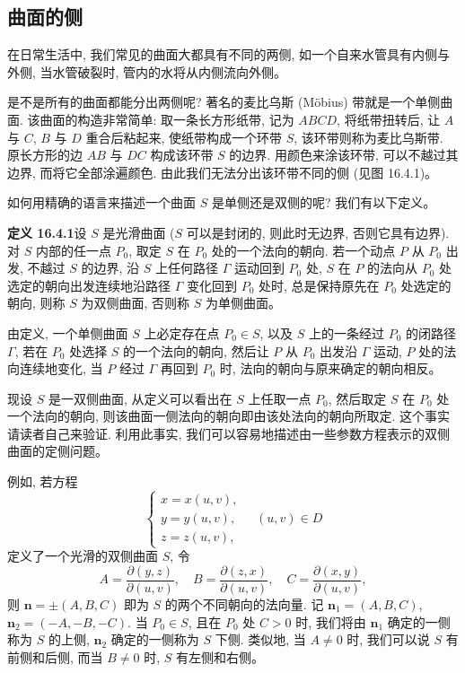 \documentclass[UTF8,12pt,a4paper,fontset=fandol]{ctexart}
\begin{document}
\subsection{曲面的侧}

在日常生活中, 我们常见的曲面大都具有不同的两侧, 如一个自来水管具有内侧与外侧, 当水管破裂时, 管内的水将从内侧流向外侧。

是不是所有的曲面都能分出两侧呢? 著名的麦比乌斯 (Möbius) 带就是一个单侧曲面. 该曲面的构造非常简单: 取一条长方形纸带, 记为 $ABCD$, 将纸带扭转后, 让 $A$ 与 $C$, $B$ 与 $D$ 重合后粘起来, 使纸带构成一个环带 $S$, 该环带则称为麦比乌斯带. 原长方形的边 $AB$ 与 $DC$ 构成该环带 $S$ 的边界. 用颜色来涂该环带, 可以不越过其边界, 而将它全部涂遍颜色. 由此我们无法分出该环带不同的侧 (见图 16.4.1)。

如何用精确的语言来描述一个曲面 $S$ 是单侧还是双侧的呢? 我们有以下定义。

\noindent\textbf{定义 16.4.1}\quad 设 $S$ 是光滑曲面 ($S$ 可以是封闭的, 则此时无边界, 否则它具有边界). 对 $S$ 内部的任一点 $P_0$, 取定 $S$ 在 $P_0$ 处的一个法向的朝向. 若一个动点 $P$ 从 $P_0$ 出发, 不越过 $S$ 的边界, 沿 $S$ 上任何路径 $\Gamma$ 运动回到 $P_0$ 处, $S$ 在 $P$ 的法向从 $P_0$ 处选定的朝向出发连续地沿路径 $\Gamma$ 变化回到 $P_0$ 处时, 总是保持原先在 $P_0$ 处选定的朝向, 则称 $S$ 为双侧曲面, 否则称 $S$ 为单侧曲面。

由定义, 一个单侧曲面 $S$ 上必定存在点 $P_0\in S$, 以及 $S$ 上的一条经过 $P_0$ 的闭路径 $\Gamma$, 若在 $P_0$ 处选择 $S$ 的一个法向的朝向, 然后让 $P$ 从 $P_0$ 出发沿 $\Gamma$ 运动, $P$ 处的法向连续地变化, 当 $P$ 经过 $\Gamma$ 再回到 $P_0$ 时, 法向的朝向与原来确定的朝向相反。

现设 $S$ 是一双侧曲面, 从定义可以看出在 $S$ 上任取一点 $P_0$, 然后取定 $S$ 在 $P_0$ 处一个法向的朝向, 则该曲面一侧法向的朝向即由该处法向的朝向所取定. 这个事实请读者自己来验证. 利用此事实, 我们可以容易地描述由一些参数方程表示的双侧曲面的定侧问题。

例如, 若方程
\[
  \begin{cases}
    x=x(u,v),\\
    y=y(u,v),\\
    z=z(u,v),
  \end{cases}\quad (u,v)\in D
\]
定义了一个光滑的双侧曲面 $S$, 令
\begin{equation}
  A=\frac{\partial(y,z)}{\partial(u,v)},\quad
  B=\frac{\partial(z,x)}{\partial(u,v)},\quad
  C=\frac{\partial(x,y)}{\partial(u,v)},
  \tag{16.4.1}
\end{equation}
则 $\boldsymbol n=\pm(A,B,C)$ 即为 $S$ 的两个不同朝向的法向量. 记 $\boldsymbol n_1=(A,B,C)$, $\boldsymbol n_2=(-A,-B,-C)$. 当 $P_0\in S$, 且在 $P_0$ 处 $C>0$ 时, 我们将由 $\boldsymbol n_1$ 确定的一侧称为 $S$ 的上侧, $\boldsymbol n_2$ 确定的一侧称为 $S$ 下侧. 类似地, 当 $A\ne0$ 时, 我们可以说 $S$ 有前侧和后侧, 而当 $B\ne0$ 时, $S$ 有左侧和右侧。
\end{document}
